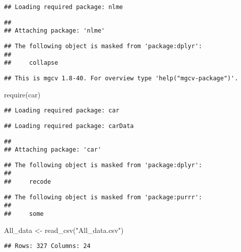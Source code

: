 \documentclass[]{elsarticle} %
\newenvironment{Shaded}{\begin{snugshade}}{\end{snugshade}}
\newcommand{\FunctionTok}[1]{\textcolor[rgb]{0.00,0.00,0.00}{#1}}
\newcommand{\NormalTok}[1]{#1}
\newcommand{\OtherTok}[1]{\textcolor[rgb]{0.56,0.35,0.01}{#1}}
\newcommand{\StringTok}[1]{\textcolor[rgb]{0.31,0.60,0.02}{#1}}
\begin{document}
\begin{verbatim}
## Loading required package: nlme
\end{verbatim}

\begin{verbatim}
## 
## Attaching package: 'nlme'
\end{verbatim}

\begin{verbatim}
## The following object is masked from 'package:dplyr':
## 
##     collapse
\end{verbatim}

\begin{verbatim}
## This is mgcv 1.8-40. For overview type 'help("mgcv-package")'.
\end{verbatim}

\begin{Shaded}
\begin{Highlighting}[]
\FunctionTok{require}\NormalTok{(car)}
\end{Highlighting}
\end{Shaded}

\begin{verbatim}
## Loading required package: car
\end{verbatim}

\begin{verbatim}
## Loading required package: carData
\end{verbatim}

\begin{verbatim}
## 
## Attaching package: 'car'
\end{verbatim}

\begin{verbatim}
## The following object is masked from 'package:dplyr':
## 
##     recode
\end{verbatim}

\begin{verbatim}
## The following object is masked from 'package:purrr':
## 
##     some
\end{verbatim}

\begin{Shaded}
\begin{Highlighting}[]
\NormalTok{All\_data }\OtherTok{\textless{}{-}} \FunctionTok{read\_csv}\NormalTok{(}\StringTok{"All\_data.csv"}\NormalTok{)}
\end{Highlighting}
\end{Shaded}

\begin{verbatim}
## Rows: 327 Columns: 24
\end{verbatim}
\end{document}
